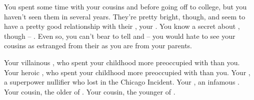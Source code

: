 \documentclass[char]{LRSguildcamp1}
\begin{document}
You spent some time with your cousins \cTeen{} and \cTween{} before going off to college, but you haven't seen them in several years.  They're pretty bright, though, and seem to have a pretty good relationship with their \cArchitect{\parent}, your \cArchitect{\uncle} \cArchitect{}.  You know a secret about \cArchitect{}, though -- .  Even so, you can't bear to tell \cTeen{} and \cTween{} -- you would hate to see your cousins as estranged from their \cArchitect{\parent} as you are from your parents.

\begin{itemz}[Goals]
	\item 
\end{itemz}

\begin{itemz}[Notes]
	\item 
\end{itemz}

\begin{contacts}
	\contact{\cOldest{\intro}} Your villainous \cOldest{\parent}, who spent your childhood more preoccupied with \cOS{} than you.
	\contact{\cOS{\intro}} Your heroic \cOS{\parent}, who spent your childhood more preoccupied with \cOldest{} than you.
	\contact{\cArchitect{\intro}} Your \cArchitect{\uncle}, a superpower nullifier who lost \cArchitect{\their} \cAS{\spouse} in the Chicago Incident.
	\contact{\cGrandma{\intro}} Your \cGrandma{\grandparent}, an infamous \cGrandma{\villain}.
	\contact{\cTeen{\intro}} Your cousin, the older \cTeen{\offspring} of \cArchitect{\Uncle} \cArchitect{}.
	\contact{\cTween{\intro}} Your cousin, the younger \cTween{\offspring} of \cArchitect{\Uncle} \cArchitect{}.
\end{contacts}
\end{document}

